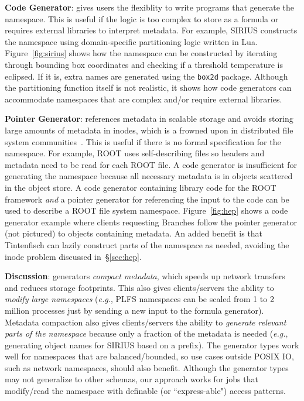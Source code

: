 \textbf{Code Generator}: gives users the flexiblity to write programs that
generate the namespace. This is useful if the logic is too complex to store as
a formula or requires external libraries to interpret metadata. For example,
SIRIUS constructs the namespace using domain-specific partitioning logic
written in Lua.  Figure~\ref{fig:sirius} shows how the namespace can be
constructed by iterating through  bounding box coordinates and checking if a
threshold temperature is eclipsed. If it is, extra names are generated using
the \texttt{box2d} package.  Although the partitioning function itself is not
realistic, it shows how code generators can accommodate namespaces that are
complex and/or require external libraries.  

\textbf{Pointer Generator}: references metadata in scalable storage and avoids
storing large amounts of metadata in inodes, which is a frowned upon in
distributed file system communities~\cite{docs:cephinternals}. This is useful
if there is no formal specification for the namespace. For example, ROOT uses
self-describing files so headers and metadata need to be read for each ROOT
file. A code generator is insufficient for generating the namespace because all
necessary metadata is in objects scattered in the object store.  A code
generator containing library code for the ROOT framework \emph{and} a pointer
generator for referencing the input to the code can be used to describe a ROOT
file system namespace.  Figure~\ref{fig:hep} shows a code generator example
where clients requesting Branches follow the pointer generator (not pictured)
to objects containing metadata. An added benefit is that Tintenfisch can lazily
construct parts of the namespace as needed, avoiding the inode problem
discussed in~\S\ref{sec:hep}.


\textbf{Discussion}: generators \emph{compact metadata}, which speeds up
network transfers and reduces storage footprints. This also gives
clients/servers the ability to \emph{modify large namespaces} ({\it e.g.}, PLFS
namespaces can be scaled from 1 to 2 million processes just by sending a new
input to the formula generator). Metadata compaction also gives clients/servers
the ability to \emph{generate relevant parts of the namespace} because only a
fraction of the metadata is needed ({\it e.g.}, generating object names for
SIRIUS based on a prefix).  The generator types work well for namespaces that
are balanced/bounded, so use cases outside POSIX IO, such as network
namespaces, should also benefit.  Although the generator types may not
generalize to other schemas, our approach works for jobs that modify/read the
namespace with definable (or ``express-able") access patterns.  

